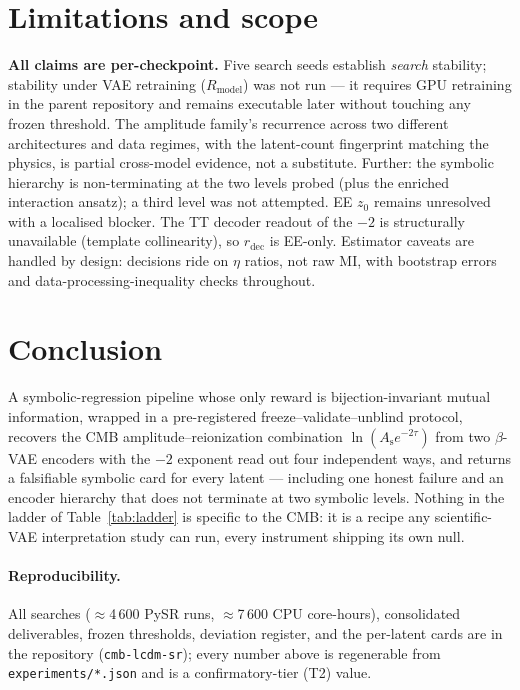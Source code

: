\documentclass[twocolumn,10pt]{article}
\newcommand{\As}{A_\mathrm{s}}
\newcommand{\combo}{\As e^{-2\tau}}
\begin{document}
\section{Limitations and scope}
\label{sec:limits}

\textbf{All claims are per-checkpoint.} Five search seeds establish
\emph{search} stability; stability under VAE retraining ($R_\mathrm{model}$)
was not run --- it requires GPU retraining in the parent repository and
remains executable later without touching any frozen threshold. The amplitude
family's recurrence across two different architectures and data regimes, with
the latent-count fingerprint matching the physics, is partial cross-model
evidence, not a substitute. Further: the symbolic hierarchy is non-terminating
at the two levels probed (plus the enriched interaction ansatz); a third level
was not attempted. EE $z_0$ remains unresolved with a localised blocker. The
TT decoder readout of the $-2$ is structurally unavailable (template
collinearity), so $r_\mathrm{dec}$ is EE-only. Estimator caveats are handled
by design: decisions ride on $\eta$ ratios, not raw MI, with bootstrap errors
and data-processing-inequality checks throughout.

\section{Conclusion}
\label{sec:conclusion}

A symbolic-regression pipeline whose only reward is bijection-invariant mutual
information, wrapped in a pre-registered freeze--validate--unblind protocol,
recovers the CMB amplitude--reionization combination $\ln(\combo)$ from two
$\beta$-VAE encoders with the $-2$ exponent read out four independent ways,
and returns a falsifiable symbolic card for every latent --- including one
honest failure and an encoder hierarchy that does not terminate at two
symbolic levels. Nothing in the ladder of Table~\ref{tab:ladder} is specific
to the CMB: it is a recipe any scientific-VAE interpretation study can run,
every instrument shipping its own null.

\paragraph*{Reproducibility.} All searches ($\approx$4\,600 PySR runs,
$\approx$7\,600 CPU core-hours), consolidated deliverables, frozen thresholds,
deviation register, and the per-latent cards are in the repository
(\texttt{cmb-lcdm-sr}); every number above is regenerable from
\texttt{experiments/*.json} and is a confirmatory-tier (T2) value.
\end{document}
